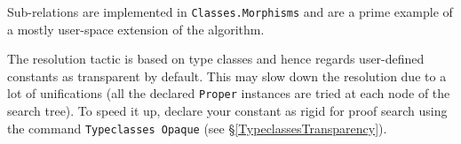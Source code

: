 Sub-relations are implemented in \texttt{Classes.Morphisms} and are a 
prime example of a mostly user-space extension of the algorithm.


The resolution tactic is based on type classes and hence regards user-defined 
constants as transparent by default. This may slow down the resolution
due to a lot of unifications (all the declared \texttt{Proper}
instances are tried at each node of the search tree).
To speed it up, declare your constant as rigid for proof search
using the command \texttt{Typeclasses Opaque} (see \S \ref{TypeclassesTransparency}).

